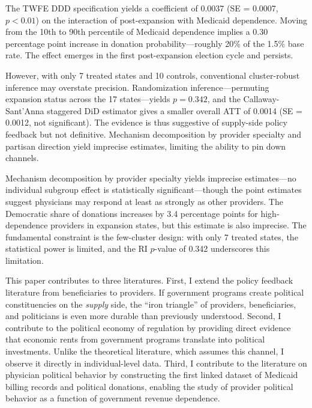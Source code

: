 \documentclass[12pt]{article}
\begin{document}
The TWFE DDD specification yields a coefficient of 0.0037 (SE = 0.0007, $p < 0.01$) on the interaction of post-expansion with Medicaid dependence. Moving from the 10th to 90th percentile of Medicaid dependence implies a 0.30 percentage point increase in donation probability---roughly 20\% of the 1.5\% base rate. The effect emerges in the first post-expansion election cycle and persists.

However, with only 7 treated states and 10 controls, conventional cluster-robust inference may overstate precision. Randomization inference---permuting expansion status across the 17 states---yields $p = 0.342$, and the Callaway-Sant'Anna staggered DiD estimator gives a smaller overall ATT of 0.0014 (SE = 0.0012, not significant). The evidence is thus suggestive of supply-side policy feedback but not definitive. Mechanism decomposition by provider specialty and partisan direction yield imprecise estimates, limiting the ability to pin down channels.

Mechanism decomposition by provider specialty yields imprecise estimates---no individual subgroup effect is statistically significant---though the point estimates suggest physicians may respond at least as strongly as other providers. The Democratic share of donations increases by 3.4 percentage points for high-dependence providers in expansion states, but this estimate is also imprecise. The fundamental constraint is the few-cluster design: with only 7 treated states, the statistical power is limited, and the RI $p$-value of 0.342 underscores this limitation.

This paper contributes to three literatures. First, I extend the policy feedback literature \citep{pierson1993when, campbell2003have, mettler2011submerged, clinton2018politics} from beneficiaries to providers. If government programs create political constituencies on the \textit{supply} side, the ``iron triangle'' of providers, beneficiaries, and politicians is even more durable than previously understood. Second, I contribute to the political economy of regulation \citep{stigler1971theory, peltzman1976toward, grossman2001special} by providing direct evidence that economic rents from government programs translate into political investments. Unlike the theoretical literature, which assumes this channel, I observe it directly in individual-level data. Third, I contribute to the literature on physician political behavior \citep{bonica2014political, hersh2016democratic, jena2018physicians, kim2024partisan} by constructing the first linked dataset of Medicaid billing records and political donations, enabling the study of provider political behavior as a function of government revenue dependence.
\end{document}

